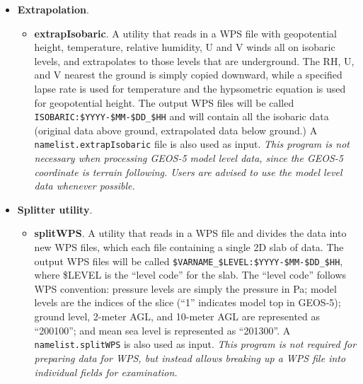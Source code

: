 \begin{itemize}
\begin{itemize}
\item \textbf{createRH}. A utility that reads in a WPS file with either model 
  or isobaric level temperatures, specific humidity, and pressure, plus 
  optional surface pressure, 2-meter temperature, and 2-meter specific 
  humidity, and derives relative humidity on those levels.  The output WPS 
  files will have prefixes of
  \texttt{RH\_2M\_ABOVE\_GROUND\_LEVEL}, \texttt{RH\_MODEL\_LEVEL}, and/or 
  \texttt{RH\_ISOBARIC\_LEVEL}, and will end with the familiar 
  \texttt{\$YYYY-\$MM-\$DD\_\$HH} string.  A \texttt{namelist.createRH} file 
  is also used as input. \emph{This program is recommended} because some 
  versions of REAL do not correctly interpolate specific 
  humidity, and because the WRF definition of RH is strictly w.r.t.~liquid 
  while some versions of GEOS-5 output a weighted average of RT 
  w.r.t.~liquid and ice that is a function of temperature.
  
\end{itemize}

\item \textbf{Extrapolation}. 
\begin{itemize}
\item \textbf{extrapIsobaric}.  A utility that reads in a WPS file with 
geopotential height, temperature, relative humidity, U and V winds all on 
isobaric levels, and extrapolates to those levels that are underground.  The 
RH, U, and V nearest the ground is simply copied downward, while a specified 
lapse rate is used for temperature and the hypsometric equation is used for 
geopotential height.  The output WPS files will be called 
\texttt{ISOBARIC:\$YYYY-\$MM-\$DD\_\$HH} and will contain all the isobaric 
data (original data above ground, extrapolated data below ground.)  A 
\texttt{namelist.extrapIsobaric} file is also used as input.  \emph{This 
program is not necessary when processing GEOS-5 model level data, since the 
GEOS-5 coordinate is terrain following.  Users are advised to use the model 
level data whenever possible.}
\end{itemize}

\item \textbf{Splitter utility}. 
\begin{itemize}
\item \textbf{splitWPS}. A utility that reads in a WPS file and divides the 
  data into new WPS files, which each file containing a single 2D slab of data.
  The output WPS files will be called 
  \texttt{\$VARNAME\_\$LEVEL:\$YYYY-\$MM-\$DD\_\$HH}, where \$LEVEL is 
  the ``level code'' for the slab.  The ``level code'' follows WPS convention:
  pressure levels are simply the pressure in Pa; model levels are the indices 
  of the slice (``1'' indicates model top in GEOS-5); ground level, 2-meter 
  AGL, and 10-meter AGL are represented as ``200100''; and mean sea level is 
  represented as ``201300''.  A \texttt{namelist.splitWPS} is also used as 
  input. \emph{This program is not required for preparing data for WPS, but 
  instead allows breaking up a WPS file into individual fields for 
  examination.}  
\end{itemize}

\end{itemize}

